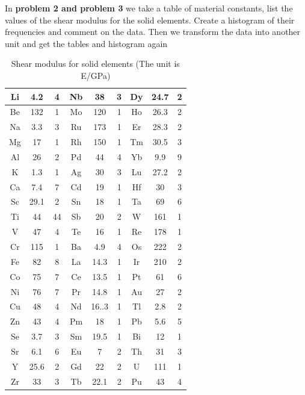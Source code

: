 \documentclass[12pt]{article}
\begin{document}
\par In \textbf{problem 2 and problem 3} we take a table of material constants, list the values of the
shear modulus for the solid elements. Create a histogram of their frequencies and comment on the data. Then we transform the data into another unit and get the tables and histogram again
\begin{table}[H]
\centering
\caption{Shear modulus for solid elements (The unit is E/GPa)}
\begin{tabular}{|c|c|c|c|c|c|c|c|c|}
\hline
Li & 4.2  & 4  & Nb & 38    & 3 & Dy & 24.7 & 2 \\ \hline
Be & 132  & 1  & Mo & 120   & 1 & Ho & 26.3 & 2 \\ \hline
Na & 3.3  & 3  & Ru & 173   & 1 & Er & 28.3 & 2 \\ \hline
Mg & 17   & 1  & Rh & 150   & 1 & Tm & 30.5 & 3 \\ \hline
Al & 26   & 2  & Pd & 44    & 4 & Yb & 9.9  & 9 \\ \hline
K  & 1.3  & 1  & Ag & 30    & 3 & Lu & 27.2 & 2 \\ \hline
Ca & 7.4  & 7  & Cd & 19    & 1 & Hf & 30   & 3 \\ \hline
Sc & 29.1 & 2  & Sn & 18    & 1 & Ta & 69   & 6 \\ \hline
Ti & 44   & 44 & Sb & 20    & 2 & W  & 161  & 1 \\ \hline
V  & 47   & 4  & Te & 16    & 1 & Re & 178  & 1 \\ \hline
Cr & 115  & 1  & Ba & 4.9   & 4 & Os & 222  & 2 \\ \hline
Fe & 82   & 8  & La & 14.3  & 1 & Ir & 210  & 2 \\ \hline
Co & 75   & 7  & Ce & 13.5  & 1 & Pt & 61   & 6 \\ \hline
Ni & 76   & 7  & Pr & 14.8  & 1 & Au & 27   & 2 \\ \hline
Cu & 48   & 4  & Nd & 16..3 & 1 & Tl & 2.8  & 2 \\ \hline
Zn & 43   & 4  & Pm & 18    & 1 & Pb & 5.6  & 5 \\ \hline
Se & 3.7  & 3  & Sm & 19.5  & 1 & Bi & 12   & 1 \\ \hline
Sr & 6.1  & 6  & Eu & 7     & 2 & Th & 31   & 3 \\ \hline
Y  & 25.6 & 2  & Gd & 22    & 2 & U  & 111  & 1 \\ \hline
Zr & 33   & 3  & Tb & 22.1  & 2 & Pu & 43   & 4 \\ \hline
\end{tabular}
\end{table}
\end{document}
